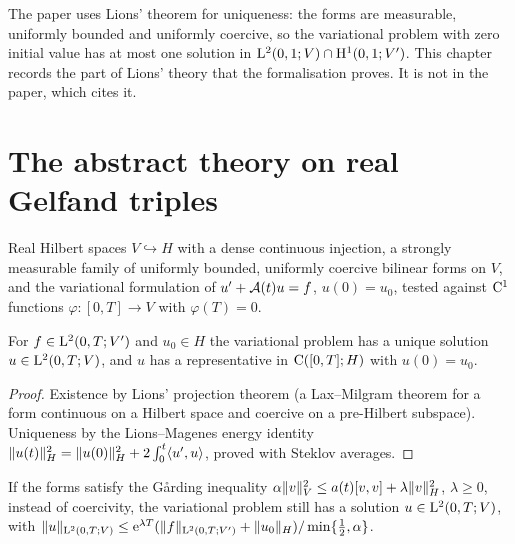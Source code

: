 The paper uses Lions' theorem for uniqueness: the forms are measurable, uniformly bounded and
uniformly coercive, so the variational problem with zero initial value has at most one solution
in $\mathrm{L}^2(0,1;V)\cap\mathrm{H}^1(0,1;V')$.  This chapter records the part of Lions' theory that the
formalisation proves.  It is not in the paper, which cites it.

\section{The abstract theory on real Gelfand triples}

\begin{definition}
  \label{def:gelfand}
  \leanok
  Real Hilbert spaces $V\hookrightarrow H$ with a dense continuous injection, a strongly
  measurable family of uniformly bounded, uniformly coercive bilinear forms on $V$, and the
  variational formulation of $u'+\mathcal{A}(t)u=f$, $u(0)=u_0$, tested against $\mathrm{C}^1$ functions
  $\varphi:[0,T]\to V$ with $\varphi(T)=0$.
\end{definition}

\begin{theorem}
  \label{thm:lions}
  \leanok
  For $f\in\mathrm{L}^2(0,T;V')$ and $u_0\in H$ the variational problem has a unique solution
  $u\in\mathrm{L}^2(0,T;V)$, and $u$ has a representative in $\mathrm{C}([0,T];H)$ with $u(0)=u_0$.
\end{theorem}

\begin{proof}
  \leanok
  Existence by Lions' projection theorem (a Lax--Milgram theorem for a form continuous on a
  Hilbert space and coercive on a pre-Hilbert subspace).  Uniqueness by the Lions--Magenes
  energy identity $\lVert u(t)\rVert_H^2=\lVert u(0)\rVert_H^2+2\int_0^t\langle u',u\rangle$, proved with
  Steklov averages.
\end{proof}

\begin{theorem}
  \label{thm:lions-garding}
  \leanok
  If the forms satisfy the Gårding inequality
  $\alpha\lVert v\rVert_V^2\leq a(t)[v,v]+\lambda\lVert v\rVert_H^2$, $\lambda\geq0$, instead of coercivity, the
  variational problem still has a solution $u\in\mathrm{L}^2(0,T;V)$, with
  $\lVert u\rVert_{\mathrm{L}^2(0,T;V)}\leq\mathrm{e}^{\lambda T}(\lVert f\rVert_{\mathrm{L}^2(0,T;V')}+\lVert u_0\rVert_H)/\min\{\frac12,\alpha\}$.
\end{theorem}

